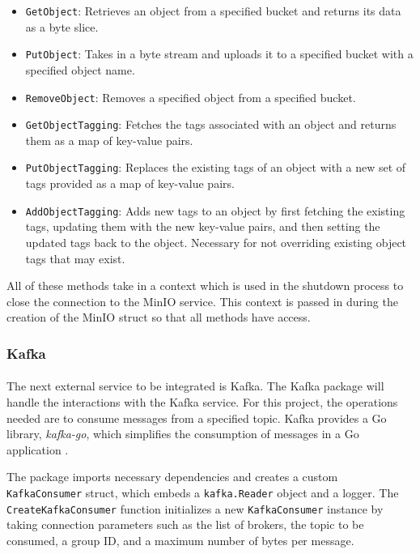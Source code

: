 \documentclass[12pt, conference, final, a4paper, onecolumn, compsoc]{IEEEtran}
\begin{document}
\begin{itemize}
  \item \texttt{GetObject}: Retrieves an object from a specified bucket and
        returns its data as a byte slice.
  \item \texttt{PutObject}: Takes in a byte stream and uploads it to a specified
        bucket with a specified object name.
  \item \texttt{RemoveObject}: Removes a specified object from a specified
        bucket.
  \item \texttt{GetObjectTagging}: Fetches the tags associated with an object
        and returns them as a map of key-value pairs.
  \item \texttt{PutObjectTagging}: Replaces the existing tags of an object with
        a new set of tags provided as a map of key-value pairs.
  \item \texttt{AddObjectTagging}: Adds new tags to an object by first fetching
        the existing tags, updating them with the new key-value pairs, and then
        setting the updated tags back to the object. Necessary for not
        overriding existing object tags that may exist.
\end{itemize}

All of these methods take in a context which is used in the shutdown process to
close the connection to the MinIO service. This context is passed in during the
creation of the MinIO struct so that all methods have access.

\subsubsection*{Kafka}
\paragraph{}

The next external service to be integrated is Kafka. The Kafka package will
handle the interactions with the Kafka service. For this project, the operations
needed are to consume messages from a specified topic. Kafka provides a Go
library, \textit{kafka-go}, which simplifies the consumption of messages in a Go
application \citep{kafka-go-repo}.

The package imports necessary dependencies and creates a custom
\texttt{KafkaConsumer} struct, which embeds a \texttt{kafka.Reader} object and a
logger. The \texttt{CreateKafkaConsumer} function initializes a new
\texttt{KafkaConsumer} instance by taking connection parameters such as the list
of brokers, the topic to be consumed, a group ID, and a maximum number of bytes
per message.
\end{document}
